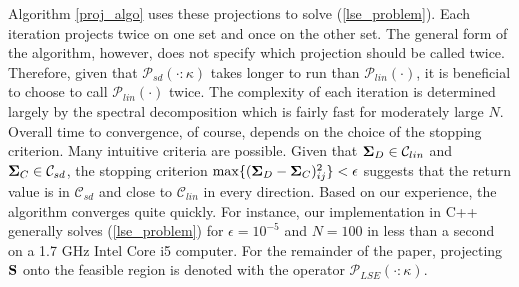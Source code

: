 \documentclass[11pt]{article}
\theoremstyle{definition}
\theoremstyle{definition}
\def\bSigma{{\bf \Sigma}}
\def\SS{{\bf S}}
\begin{document}
 Algorithm \ref{proj_algo} uses these projections to solve (\ref{lse_problem}).  Each iteration projects twice on one set and once on the other set. The general form of the algorithm, however, does not specify which projection should be called twice. Therefore, given that $\mathcal{P}_{sd}(\cdot:\kappa)$ takes longer to run than $\mathcal{P}_{lin}(\cdot)$, it is beneficial to choose to call $\mathcal{P}_{lin}(\cdot)$ twice. The complexity of each iteration is determined largely by the spectral decomposition which is fairly fast for moderately large $N$. Overall time to convergence, of course, depends on the choice of the stopping criterion. Many intuitive criteria are possible. Given that $\bSigma_D \in \mathcal{C}_{lin}$ and $\bSigma_C \in \mathcal{C}_{sd}$, the stopping criterion $\max \{(\bSigma_{D}-\bSigma_{C})_{ij}^2\} < \epsilon$ suggests that the return value is in $\mathcal{C}_{sd}$ and close to $\mathcal{C}_{lin}$ in every direction. Based on our experience, the algorithm converges quite quickly. For instance, our implementation in C++ generally solves (\ref{lse_problem}) for $\epsilon = 10^{-5}$ and $N = 100$  in less than a second on a 1.7 GHz Intel Core i5 computer.  For the remainder of the paper, projecting $\SS$ onto the feasible region is denoted with the operator $\mathcal{P}_{LSE}(\cdot : \kappa)$.
 
 
% 
% 

% 
  
\end{document}
